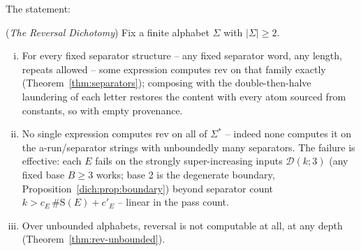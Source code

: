 \documentclass[runningheads,envcountsect]{llncs}
\begin{document}
The statement:

\begin{theorem}
    (\emph{The Reversal Dichotomy})
    \label{thm:dichotomy}
    Fix a finite alphabet $\Sigma$ with $|\Sigma| \geq 2$.
    \begin{enumerate}[(i)]
        \item For every fixed separator structure -- any fixed separator word, any length, repeats allowed -- some expression computes $\mathrm{rev}$ on that family exactly (Theorem~\ref{thm:separators}); composing with the double-then-halve laundering of each letter restores the content with every atom sourced from constants, so with empty provenance.
        \item No single expression computes $\mathrm{rev}$ on all of $\Sigma^*$ -- indeed none computes it on the a-run/separator strings with unboundedly many separators. The failure is effective: each $E$ fails on the strongly super-increasing inputs $\mathcal D(k;3)$ (any fixed base $B \ge 3$ works; base 2 is the degenerate boundary, Proposition~\ref{dich:prop:boundary}) beyond separator count $k > c_{E}\,\#\mathrm{S}(E) + c'_{E}$ -- linear in the pass count.
        \item Over unbounded alphabets, reversal is not computable at all, at any depth (Theorem~\ref{thm:rev-unbounded}).
    \end{enumerate}
\end{theorem}
\end{document}
